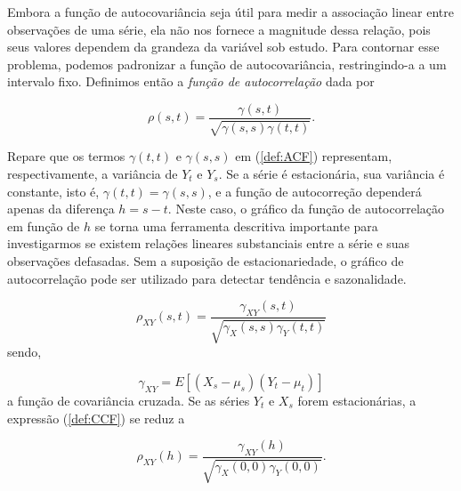 Embora a função de autocovariância seja útil para medir a associação linear entre observações de uma série, ela não nos fornece a magnitude dessa relação, pois seus valores dependem da grandeza da variável sob estudo. Para contornar esse problema, podemos padronizar a função de autocovariância, restringindo-a a um intervalo fixo. Definimos então a \textit{função de autocorrelação} dada por

\begin{equation}
\rho(s,t) = \frac{\gamma(s, t)}{\sqrt{\gamma(s,s)\gamma(t,t)}}.
\label{def:ACF}
\end{equation}

Repare que os termos $\gamma(t,t)$ e $\gamma(s,s)$ em (\ref{def:ACF}) representam, respectivamente, a variância de $Y_t$ e $Y_s$. Se a série é estacionária, sua variância é constante, isto é, $\gamma(t,t) = \gamma(s,s)$, e a função de autocorreção dependerá apenas da diferença $h = s-t$. Neste caso, o gráfico da função de autocorrelação em função de $h$ se torna uma ferramenta descritiva importante para investigarmos se existem relações lineares substanciais entre a série e suas observações defasadas. Sem a suposição de estacionariedade, o gráfico de autocorrelação pode ser utilizado para detectar tendência e sazonalidade.


\begin{equation}
\rho_{XY}(s,t) = \frac{\gamma_{XY}(s,t)}{\sqrt{\gamma_X(s,s) \gamma_Y(t,t)}}
\label{def:CCF}
\end{equation}
sendo,

\begin{displaymath}
\gamma_{XY} = E\left[(X_s - \mu_s)(Y_t - \mu_t)\right]
\end{displaymath}
a função de covariância cruzada. Se as séries $Y_t$ e $X_s$ forem estacionárias, a expressão (\ref{def:CCF}) se reduz a 

\begin{equation}
\rho_{XY}(h) = \frac{\gamma_{XY}(h)}{\sqrt{\gamma_X(0,0) \gamma_Y(0,0)}}.
\end{equation}